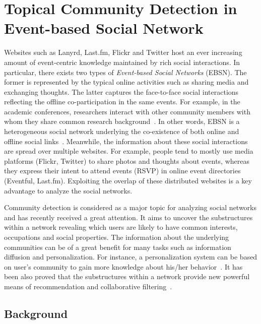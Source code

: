 \chapter{Topical Community Detection in Event-based Social Network}  \label{ch:community-detection}
\graphicspath{{Part2/Chapter3/figures/}}

Websites such as   Lanyrd, Last.fm, Flickr and Twitter host an ever increasing amount of event-centric knowledge maintained by rich social interactions. In particular, there exists two types of \textit{Event-based Social Networks} (EBSN). The former is represented by the typical online activities such as sharing media and exchanging thoughts. The latter captures the face-to-face social interactions reflecting the offline co-participation in the same events. For example, in the academic conferences, researchers interact with other community members with whom they share common research background~\cite{Li:dasfa11a}. In other words, EBSN is a heterogeneous social network underlying the co-existence of both online and offline social links~\cite{Liu:KDD12}. Meanwhile, the information about these social interactions are spread over multiple websites. For example, people tend to mostly use media platforms (Flickr, Twitter) to share photos and thoughts about events, whereas they express their intent to attend events (RSVP) in online event directories (Eventful, Last.fm). Exploiting the overlap of these distributed websites is a key advantage to analyze the social networks. 

Community detection is considered as a major topic for analyzing social networks and has recently received a great attention. It aims to uncover the substructures within a network revealing which users are likely to have common interests, occupations and social properties. The information about the underlying communities can be of a great benefit for many tasks such as information diffusion and personalization. For instance, a personalization system can be based on user's community to gain more knowledge about his/her behavior~\cite{Shardanand:SIGCHI95,Paliouras:2012}. It has been also proved that the substructures within a network provide new powerful means of recommendation and collaborative filtering~\cite{Konstan:2012,Paliouras:2012}.


\section{Background} \label{sec:background}

